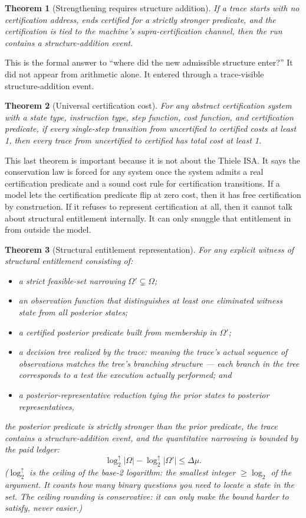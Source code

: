 \documentclass[11pt,a4paper]{article}
\theoremstyle{plain}
\newtheorem{theorem}{Theorem}[section]
\theoremstyle{definition}
\theoremstyle{remark}
\begin{document}
\begin{theorem}[Strengthening requires structure addition]
If a trace starts with no certification address, ends certified for a strictly stronger predicate, and the certification is tied to the machine's supra-certification channel, then the run contains a structure-addition event.
\end{theorem}

This is the formal answer to ``where did the new admissible structure enter?'' It did not appear from arithmetic alone. It entered through a trace-visible structure-addition event.

\begin{theorem}[Universal certification cost]
For any abstract certification system with a state type, instruction type, step function, cost function, and certification predicate, if every single-step transition from uncertified to certified costs at least 1, then every trace from uncertified to certified has total cost at least 1.
\end{theorem}

This last theorem is important because it is not about the Thiele ISA. It says the conservation law is forced for any system once the system admits a real certification predicate and a sound cost rule for certification transitions. If a model lets the certification predicate flip at zero cost, then it has free certification by construction. If it refuses to represent certification at all, then it cannot talk about structural entitlement internally. It can only smuggle that entitlement in from outside the model.

\begin{theorem}[Structural entitlement representation]
For any explicit witness of structural entitlement consisting of:
\begin{itemize}
\item a strict feasible-set narrowing $\Omega' \subsetneq \Omega$;
\item an observation function that distinguishes at least one eliminated witness state from all posterior states;
\item a certified posterior predicate built from membership in $\Omega'$;
\item a decision tree \emph{realized by the trace}: meaning the trace's actual sequence of observations matches the tree's branching structure --- each branch in the tree corresponds to a test the execution actually performed; and
\item a posterior-representative reduction tying the prior states to posterior representatives,
\end{itemize}
the posterior predicate is strictly stronger than the prior predicate, the trace contains a structure-addition event, and the quantitative narrowing is bounded by the paid ledger:
\[
\log_2^{\uparrow}|\Omega| - \log_2^{\uparrow}|\Omega'| \leq \Delta \mu.
\]
($\log_2^{\uparrow}$ is the ceiling of the base-2 logarithm: the smallest integer $\geq \log_2$ of the argument. It counts how many binary questions you need to locate a state in the set. The ceiling rounding is conservative: it can only make the bound harder to satisfy, never easier.)
\end{theorem}
\end{document}
